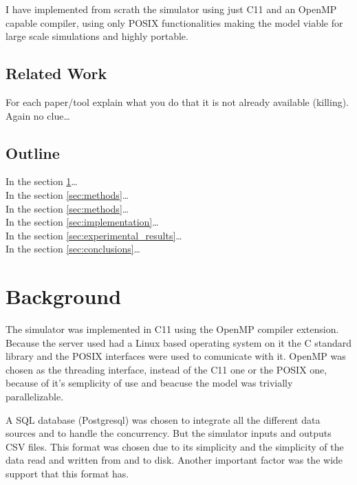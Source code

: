 \documentclass[draft]{article}
\begin{document}
I have implemented from scrath the simulator using just C11 and an OpenMP
capable compiler, using only POSIX functionalities making the model viable for
large scale simulations and highly portable. %

\subsection{Related Work}\label{sec:related_work}

For each paper/tool explain what you do that it is not already available
(killing). Again no clue\dots

\subsection{Outline}\label{sec:outline}

In the section \ref{sec:background}\dots\\
In the section \ref{sec:methods}\dots\\
In the section \ref{sec:methods}\dots\\
In the section \ref{sec:implementation}\dots\\
In the section \ref{sec:experimental_results}\dots\\
In the section \ref{sec:conclusions}\dots\\

\section{Background}\label{sec:background}

The simulator was implemented in C11 using the OpenMP compiler extension.
Because the server used had a Linux based operating system on it the C standard
library and the POSIX interfaces were used to comunicate with it. OpenMP was
chosen as the threading interface, instead of the C11 one or the POSIX one,
because of it's semplicity of use and beacuse the model was trivially
parallelizable.

A SQL database (Postgresql) was chosen to integrate all the different data
sources and to handle the concurrency. But the simulator inputs and outputs CSV
files. This format was chosen due to its simplicity and the simplicity of the
data read and written from and to disk. Another important factor was the wide
support that this format has.
\end{document}
